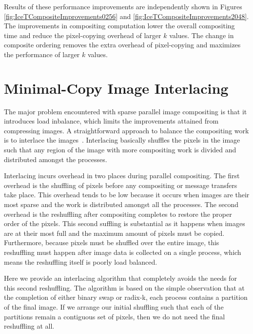 \documentclass{vgtc}                          %
\newcommand*{\lcite}[1]{~\cite{#1}}
\begin{document}
Results of these performance improvements are independently shown in
Figures \ref{fig:IceTCompositeImprovements0256} and
\ref{fig:IceTCompositeImprovements2048}.  The improvements in compositing
computation lower the overall compositing time and reduce the pixel-copying
overhead of larger $k$ values.  The change in composite ordering removes
the extra overhead of pixel-copying and maximizes the performance of larger
$k$ values.

\section{Minimal-Copy Image Interlacing}
\label{sec:ImageInterlacing}

The major problem encountered with sparse parallel image compositing is
that it introduces load inbalance, which limits the improvements attained
from compressing images.  A straightforward approach to balance the
compositing work is to interlace the
images\lcite{Molnar1994,Takeuchi2003}.  Interlacing basically shuffles the
pixels in the image such that any region of the image with more compositing
work is divided and distributed amongst the processes.

Interlacing incurs overhead in two places during parallel compositing.  The
first overhead is the shuffling of pixels before any compositing or message
transfers take place.  This overhead tends to be low because it occurs when
images are their most sparse and the work is distributed amongst all the
processes.  The second overhead is the reshuffling after compositing
completes to restore the proper order of the pixels.  This second suffling
is substantial as it happens when images are at their most full and the
maximum amount of pixels must be copied.  Furthermore, because pixels must
be shuffled over the entire image, this reshuffling must happen after image
data is collected on a single process, which means the reshuffling itself
is poorly load balanced.

Here we provide an interlacing algorithm that completely avoids the needs
for this second reshuffling.  The algorithm is based on the simple
observation that at the completion of either binary swap or radix-k, each
process contains a partition of the final image.  If we arrange our initial
shuffling such that each of the partitions remain a contiguous set of
pixels, then we do not need the final reshuffling at all.
\end{document}
